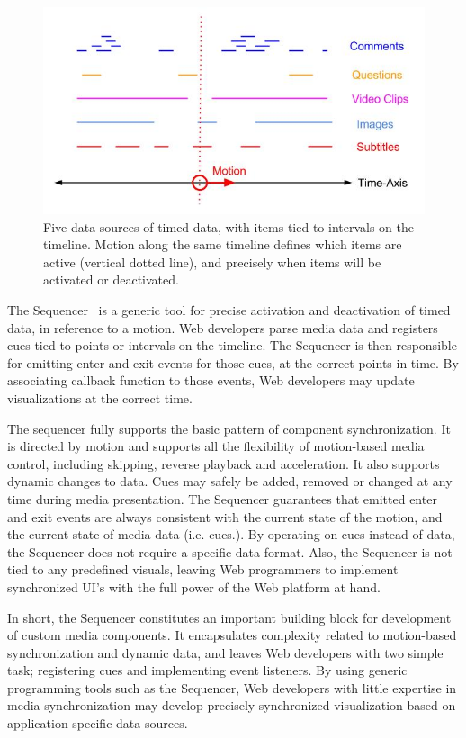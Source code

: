 \begin{figure}[h]
\centering
\includegraphics[scale=.4]{fig/sequencer.jpg}
\caption{Five data sources of timed data, with items tied to intervals on the timeline. Motion along the same timeline defines which items are active (vertical dotted line), and precisely when items will be activated or deactivated.}
\label{fig:sequencer}
\end{figure}


The Sequencer~\cite{sequencer} is a generic tool for precise activation and
deactivation of timed data, in reference to a motion. Web developers parse
media data and registers cues tied to points or intervals on the timeline. The
Sequencer is then responsible for emitting enter and exit events for those
cues, at the correct points in time. By associating callback function to those
events, Web developers may update visualizations at the correct time.

The sequencer fully supports the basic pattern of component synchronization.
It is directed by motion and supports all the flexibility of motion-based
media control, including skipping, reverse playback and acceleration. It also
supports dynamic changes to data. Cues may safely be added, removed or changed
at any time during media presentation. The Sequencer guarantees that emitted
enter and exit events are always consistent with the current state of the
motion, and the current state of media data (i.e. cues.). By operating on cues
instead of data, the Sequencer does not require a specific data format. Also,
the Sequencer is not tied to any predefined visuals, leaving Web programmers
to implement synchronized UI’s with the full power of the Web platform at
hand.

In short, the Sequencer constitutes an important building block for
development of custom media components. It encapsulates complexity related to
motion-based synchronization and dynamic data, and leaves Web developers with
two simple task; registering cues and implementing event listeners. By using
generic programming tools such as the Sequencer,  Web developers with little
expertise in media synchronization may develop precisely synchronized
visualization based on application specific data sources.

